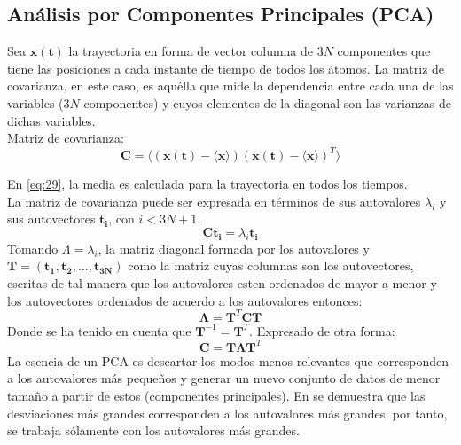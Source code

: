 \subsection{An\'{a}lisis por Componentes Principales (PCA)}
Sea $\mathbf{x(t)}$ la trayectoria en forma de vector columna de $3N$ componentes que tiene las posiciones a cada instante de tiempo de todos los \'{a}tomos. La matriz de covarianza, en este caso, es aqu\'{e}lla que mide la dependencia entre cada una de las variables ($3N$ componentes) y cuyos elementos de la diagonal son las varianzas de dichas variables.\\

Matriz de covarianza:
\begin{equation}\label{eq:28}
\mathbf{C}=\langle(\mathbf{x(t)}-\langle\mathbf{x}\rangle)(\mathbf{x(t)}-\langle\mathbf{x}\rangle)^T\rangle
\end{equation}

En \eqref{eq:29}, la media es calculada para la trayectoria en todos los tiempos.\\
La matriz de covarianza puede ser expresada en t\'{e}rminos de sus autovalores  $\lambda_i$ y sus autovectores $\mathbf{t_i}$, con $i<3N+1$.
\begin{equation}\label{eq:48}
\mathbf{C}\mathbf{t_i}=\lambda_i\mathbf{t_i}
\end{equation}
Tomando $\Lambda={\lambda_i}$, la matriz diagonal formada por los autovalores y $\mathbf{T}=\left(\mathbf{t_1},\mathbf{t_2},...,\mathbf{t_{3N}}\right)$ como la matriz cuyas columnas son los autovectores, escritas de tal manera que los autovalores esten ordenados de mayor a menor y los autovectores ordenados de acuerdo a los autovalores entonces:
\begin{equation}\label{eq:29}
\mathbf{\Lambda}=\mathbf{T}^T\mathbf{C}\mathbf{T}
\end{equation}
Donde se ha tenido en cuenta que $\mathbf{T}^{-1}=\mathbf{T}^T$. Expresado de otra forma:
\begin{equation}\label{eq:30}
\mathbf{C}=\mathbf{T}\mathbf{\Lambda} \mathbf{T}^T
\end{equation}
La esencia de un PCA es descartar los modos menos relevantes que corresponden a los autovalores m\'{a}s peque\~{n}os y generar un nuevo conjunto de datos de menor tama\~{n}o a partir de estos (componentes principales). En \cite{Amadei1993} se demuestra que las desviaciones m\'{a}s grandes corresponden a los autovalores m\'{a}s grandes, por tanto, se trabaja s\'{o}lamente con los autovalores m\'{a}s grandes. \\

